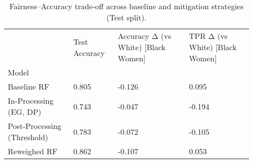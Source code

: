 \begin{table}[htbp]
\centering
\caption{Fairness–Accuracy trade-off across baseline and mitigation strategies (Test split).}
\label{tab:mitigation-effectiveness}
\begin{tabular}{llll}
\toprule
 & Test Accuracy & Accuracy Δ (vs White) [Black Women] & TPR Δ (vs White) [Black Women] \\
Model &  &  &  \\
\midrule
Baseline RF & 0.805 & -0.126 & 0.095 \\
In-Processing (EG, DP) & 0.743 & -0.047 & -0.194 \\
Post-Processing (Threshold) & 0.783 & -0.072 & -0.105 \\
Reweighed RF & 0.862 & -0.107 & 0.053 \\
\bottomrule
\end{tabular}

\end{table}